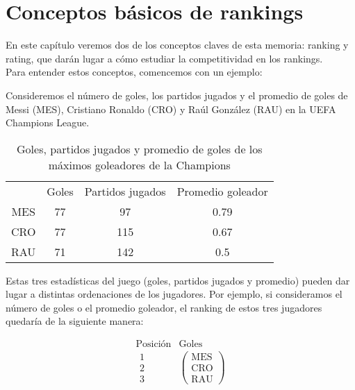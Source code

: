 \chapter{Conceptos básicos de rankings} \label{chp:conceptos_basicos}

En este capítulo veremos dos de los conceptos claves de esta memoria: ranking y rating, que darán lugar a cómo estudiar la competitividad en los rankings.\\

Para entender estos conceptos, comencemos con un ejemplo:

\begin{ejemplo}
Consideremos el número de goles, los partidos jugados y el promedio de goles de Messi (MES), Cristiano Ronaldo (CRO) y Raúl González (RAU) en la UEFA Champions League.

\begin{table}[h]
\centering
\caption[Goles, partidos jugados de los máximos goleadores de la Champions]{Goles, partidos jugados y promedio de goles de los máximos goleadores de la Champions}
\label{tbl:goles_champions}

\begin{tabular}{cccc}
\cline{2-4}
    & Goles & Partidos jugados & Promedio goleador \\ \cline{2-4} 
MES & 77    & 97               & 0.79              \\
CRO & 77    & 115              & 0.67              \\
RAU & 71    & 142              & 0.5               \\ \hline
\end{tabular}
\end{table}


Estas tres estadísticas del juego (goles, partidos jugados y promedio) pueden dar lugar a distintas ordenaciones de los jugadores. Por ejemplo, si consideramos el número de goles o el promedio goleador, el ranking de estos tres jugadores quedaría de la siguiente manera:

\[
\begin{array}{cc}
\text{Posición} & \text{Goles}\\ 
\begin{array}{c}
\text{1}\\
\text{2}\\
\text{3}
\end{array} & \left(\begin{array}{c}
\text{MES}\\
\text{CRO}\\
\text{RAU}
\end{array} \right)
\end{array}
\] 


\end{ejemplo}

